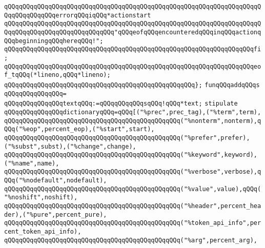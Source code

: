 \verb|qQQqqQQqqQQqqQQqqQQqqQQqqQQqqQQqqQQqqQQqqQQqqQQqqQQqqQQqqQQqqQQqqQQqqQQqqQQqqQQqqQQqerrorqQQqiqQQq*actionstart|\newline
\verb|qQQqqQQqqQQqqQQqqQQqqQQqqQQqqQQqqQQqqQQqqQQqqQQqqQQqqQQqqQQqqQQqqQQqqQQqqQQqqQQqqQQqqQQqqQQqqQQqqQQq"qQQqeofqQQqencounteredqQQqinqQQqactionqQQqbeginningqQQqhereqQQq!";|\newline
\verb|qQQqqQQqqQQqqQQqqQQqqQQqqQQqqQQqqQQqqQQqqQQqqQQqqQQqqQQqqQQqqQQqqQQqfi;|\newline
\newline
\verb|qQQqqQQqqQQqqQQqqQQqqQQqqQQqqQQqqQQqqQQqqQQqqQQqqQQqqQQqqQQqqQQqqQQqeof_tqQQq(*lineno,qQQq*lineno);|\newline
\verb|qQQqqQQqqQQqqQQqqQQqqQQqqQQqqQQqqQQqqQQqqQQqqQQqqQQq};|\newline
\newline
\verb|funqQQqaddqQQqs|\newline
\verb|qQQqqQQqqQQqqQQq=|\newline
\verb|qQQqqQQqqQQqqQQqtextqQQq:=qQQqqQQqqQQqsqQQq!qQQq*text;|\newline
\newline
\newline
\verb|stipulate|\newline
\newline
\verb|qQQqqQQqqQQqqQQqdictionaryqQQq=qQQq[("%prec",prec_tag),("%term",term),|\newline
\verb|qQQqqQQqqQQqqQQqqQQqqQQqqQQqqQQqqQQqqQQqqQQqqQQq("%nonterm",nonterm),qQQq("%eop",percent_eop),("%start",start),|\newline
\verb|qQQqqQQqqQQqqQQqqQQqqQQqqQQqqQQqqQQqqQQqqQQqqQQq("%prefer",prefer),("%subst",subst),("%change",change),|\newline
\verb|qQQqqQQqqQQqqQQqqQQqqQQqqQQqqQQqqQQqqQQqqQQqqQQq("%keyword",keyword),("%name",name),|\newline
\verb|qQQqqQQqqQQqqQQqqQQqqQQqqQQqqQQqqQQqqQQqqQQqqQQq("%verbose",verbose),qQQq("%nodefault",nodefault),|\newline
\verb|qQQqqQQqqQQqqQQqqQQqqQQqqQQqqQQqqQQqqQQqqQQqqQQq("%value",value),qQQq("%noshift",noshift),|\newline
\verb|qQQqqQQqqQQqqQQqqQQqqQQqqQQqqQQqqQQqqQQqqQQqqQQq("%header",percent_header),("%pure",percent_pure),|\newline
\verb|qQQqqQQqqQQqqQQqqQQqqQQqqQQqqQQqqQQqqQQqqQQqqQQq("%token_api_info",percent_token_api_info),|\newline
\verb|qQQqqQQqqQQqqQQqqQQqqQQqqQQqqQQqqQQqqQQqqQQqqQQq("%arg",percent_arg),|\newline
